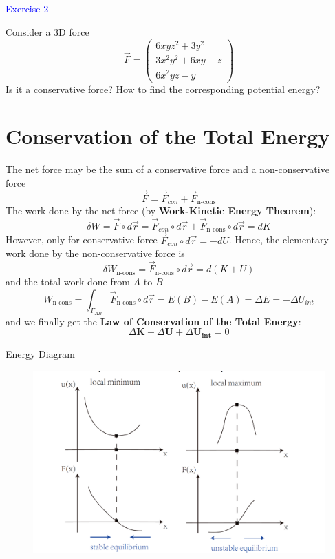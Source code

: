\documentclass{beamer}
\begin{document}
\begin{frame}
\textcolor{blue}{Exercise 2}

Consider a 3D force $$ \vec{F}=\left(\begin{array}{c}
  6xyz^2+3y^2\\
  3x^2y^2+6xy-z\\
  6x^2yz-y
  \end{array}\right)$$
  Is it a conservative force? How to find the corresponding potential energy?
\end{frame}

\section{Conservation of the Total Energy}
\begin{frame}
  The net force may be the sum of a conservative force and a non-conservative force$$\vec{F}=\vec{F}_{con}+\vec{F}_{\text {n-cons}}$$\pause
   The work done by the net force (by \textbf{Work-Kinetic Energy Theorem}):
$$
\delta W=\vec{F} \circ d \vec{r}=\vec{F}_{con } \circ d \vec{r}+\vec{F}_{\text {n-cons}} \circ d\vec{r} =d K
$$\pause
However, only for conservative force $\vec{F}_{con} \circ d \vec{r}=-d U$. Hence, the elementary work done by the non-conservative force is
$$
\delta W_{\text {n-cons}}=\vec{F}_{\text {n-cons}} \circ d \vec{r}=d(K+U)
$$\pause
and the total work done from $A$ to $B$
$$
W_{\text {n-cons}}=\int_{\Gamma_{A B}} \vec{F}_{\text {n-cons}} \circ d\vec{r}=E(B)-E(A)=\Delta E = -\Delta U_{int}
$$\pause
and we finally get the \textbf{Law of Conservation of the Total Energy}:
$$
\Delta\mathbf{K} + \Delta \mathbf{U} +\Delta \mathbf{U_{int}} = 0
$$
\end{frame}

\begin{frame}{Energy Diagram}
  \begin{figure}[htbp]
  \centering
  \includegraphics[width= 0.9\linewidth, angle =0]{EnergyDiagram.png}
  \label{fig:1}
  \end{figure}
\end{frame}
\end{document}
